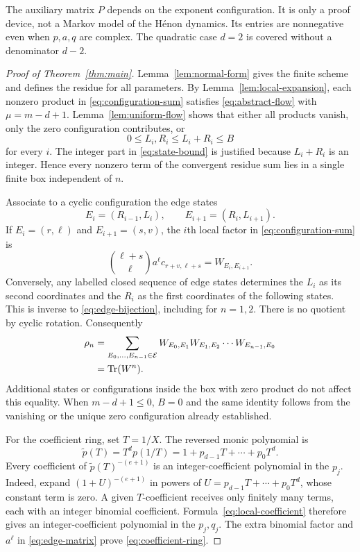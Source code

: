 The auxiliary matrix $P$ depends on the exponent configuration. It is
only a proof device, not a Markov model of the H\'enon dynamics.
Its entries are nonnegative even when $p,a,q$ are complex. The
quadratic case $d=2$ is covered without a denominator $d-2$.

\begin{proof}[Proof of Theorem~\ref{thm:main}]
Lemma~\ref{lem:normal-form} gives the finite scheme and defines the
residue for all parameters. By Lemma~\ref{lem:local-expansion}, each
nonzero product in \eqref{eq:configuration-sum} satisfies
\eqref{eq:abstract-flow} with $\mu=m-d+1$.
Lemma~\ref{lem:uniform-flow} shows that either all products vanish,
only the zero configuration contributes, or
\begin{equation}\label{eq:box-cutoff}
 0\le L_i,R_i\le L_i+R_i\le B
\end{equation}
for every $i$. The integer part in \eqref{eq:state-bound} is justified
because $L_i+R_i$ is an integer. Hence every nonzero term of the
convergent residue sum lies in a single finite box independent of $n$.

Associate to a cyclic configuration the edge states
\begin{equation}\label{eq:edge-bijection}
 E_i=(R_{i-1},L_i),\qquad E_{i+1}=(R_i,L_{i+1}).
\end{equation}
If $E_i=(r,\ell)$ and $E_{i+1}=(s,v)$, the $i$th local factor in
\eqref{eq:configuration-sum} is
\[
 \binom{\ell+s}{\ell}a^\ell c_{r+v,\ell+s}
 =W_{E_i,E_{i+1}}.
\]
Conversely, any labelled closed sequence of edge states determines
the $L_i$ as its second coordinates and the $R_i$ as the first
coordinates of the following states. This is inverse to
\eqref{eq:edge-bijection}, including for $n=1,2$. There is no quotient
by cyclic rotation. Consequently
\begin{align}
 \rho_n
 &=\sum_{E_0,\ldots,E_{n-1}\in\mathcal E}
       W_{E_0,E_1}W_{E_1,E_2}\cdots W_{E_{n-1},E_0}\notag\\
 &=\operatorname{Tr}(W^n).\label{eq:trace-closure}
\end{align}
Additional states or configurations inside the box with zero product
do not affect this equality. When $m-d+1\le0$, $B=0$ and the same
identity follows from the vanishing or the unique zero configuration
already established.

For the coefficient ring, set $T=1/X$. The reversed monic polynomial is
\[
 \widetilde p(T)=T^dp(1/T)
    =1+p_{d-1}T+\cdots+p_0T^d.
\]
Every coefficient of $\widetilde p(T)^{-(e+1)}$ is an
integer-coefficient polynomial in the $p_j$. Indeed, expand
$(1+U)^{-(e+1)}$ in powers of
$U=p_{d-1}T+\cdots+p_0T^d$, whose constant term is zero. A given
$T$-coefficient receives only finitely many terms, each with an
integer binomial coefficient. Formula~\eqref{eq:local-coefficient}
therefore gives an integer-coefficient polynomial in the $p_j,q_j$.
The extra binomial factor and $a^\ell$ in \eqref{eq:edge-matrix}
prove \eqref{eq:coefficient-ring}.


\end{proof}
